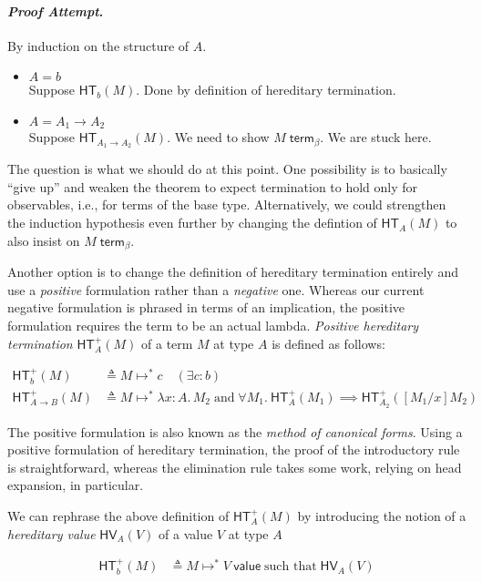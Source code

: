 \documentclass{article}
\newenvironment{proofattempt}{\paragraph{\emph{Proof Attempt}.}}{\hfill\color{red}{X}\par}
\newcommand{\hterm}[2]{\ensuremath{\mathsf{HT}_{#1}(#2)}}
\newcommand{\htermp}[2]{\ensuremath{\mathsf{HT}^+_{#1}(#2)}}
\newcommand{\termb}[1]{\ensuremath{{#1} \; \mathsf{term}_{\beta}}}
\newcommand{\hv}[2]{\ensuremath{\mathsf{HV}_{#1}(#2)}}
\newcommand{\steps}[2]{\ensuremath{#1 \mapsto^* #2}}
\newcommand{\valueJ}[1]{\ensuremath{#1\ \mathsf{value}}}
\newcommand{\fn}[2]{\ensuremath{#1 \to #2}}
\newcommand{\lam}[3]{\ensuremath{\lambda #1 {:} #2.\, #3}}
\begin{document}
\begin{proofattempt}
  By induction on the structure of $A$.
   \begin{itemize}
  \setlength\itemsep{1em}
  \item $A = b$\\
    Suppose $\hterm{b}{M}$. Done by definition of hereditary termination.  
  \item $A = \fn{A_1}{A_2}$\\
    Suppose $\hterm{\fn{A_1}{A_2}}{M}$. We need to show $\termb{M}$. We are stuck here.
  \end{itemize}
\end{proofattempt}

The question is what we should do at this point.  One possibility is to basically ``give up''
and weaken the theorem to expect termination to hold only for observables, i.e., for terms of
the base type.  Alternatively, we could strengthen the induction hypothesis even further by
changing the defintion of $\hterm{A}{M}$ to also insist on $\termb{M}$.

Another option is to change the definition of hereditary termination entirely and use a
\emph{positive} formulation rather than a \emph{negative} one.  Whereas our current negative
formulation is phrased in terms of an implication, the positive formulation requires the term
to be an actual lambda.  \emph{Positive hereditary termination} $\htermp{A}{M}$ of a term $M$ at type
$A$ is defined as follows:

\begin{align*}
  \htermp{b}{M} &\triangleq \steps{M}{c} \quad (\exists c : b)\\
  \htermp{\fn{A}{B}}{M} &\triangleq \steps{M}{\lam{x}{A}{M_2}} \; \text{and}\;
  \forall M_1.\ \htermp{A}{M_1} \implies \htermp{A_2}{[M_1/x]M_2}
\end{align*}

The positive formulation is also known as the \emph{method of canonical forms}.  Using a
positive formulation of hereditary termination, the proof of the introductory rule is
straightforward, whereas the elimination rule takes some work, relying on head expansion, in
particular.

We can rephrase the above definition of $\htermp{A}{M}$ by introducing the notion of a
\emph{hereditary value} $\hv{A}{V}$ of a value $V$ at type $A$

\begin{align*}
  \htermp{b}{M} &\triangleq \steps{M}{\valueJ{V}} \;\text{such that}\; \hv{A}{V}
\end{align*}
\end{document}
